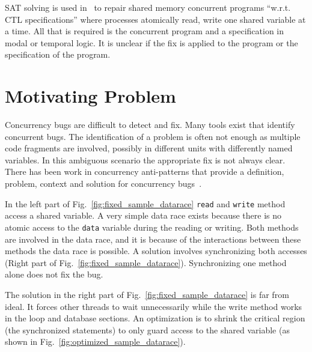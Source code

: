 \documentclass{llncs}
\begin{document}
SAT solving is used in~\cite{AY07}  to repair shared memory concurrent programs
``w.r.t. CTL specifications'' where processes atomically read, write one shared
variable at a time. All that is required is the concurrent program and a
specification in modal or temporal logic. It is unclear if the fix is applied
to the program or the specification of the program.

\section{Motivating Problem}
\label{sec:motivation}

Concurrency bugs are difficult to detect and fix. Many tools exist that
identify concurrent bugs. The identification of a problem is often not enough
as multiple code fragments are involved, possibly in different units with
differently named variables. In this ambiguous scenario the appropriate fix is
not always clear. There has been work in concurrency anti-patterns that provide
a definition, problem, context and solution for concurrency
bugs~\cite{BJ09,FKLV12}.

In the left part of Fig.~\ref{fig:fixed_sample_datarace} \texttt{read} and
\texttt{write} method access a shared variable. A very simple data race exists
because there is no atomic access to the \texttt{data} variable during the
reading or writing. Both methods are involved in the data race, and it is
because of the interactions between these methods the data race is possible. A
solution involves synchronizing both accesses (Right part of
Fig.~\ref{fig:fixed_sample_datarace}). Synchronizing one method alone does not
fix the bug.

The solution in the right part of Fig.~\ref{fig:fixed_sample_datarace} is far
from ideal. It forces other threads to wait unnecessarily while the write
method works in the loop and database sections. An optimization is to shrink
the critical region (the synchronized statements) to only guard access to the
shared variable (as shown in Fig.~\ref{fig:optimized_sample_datarace}).
\end{document}
